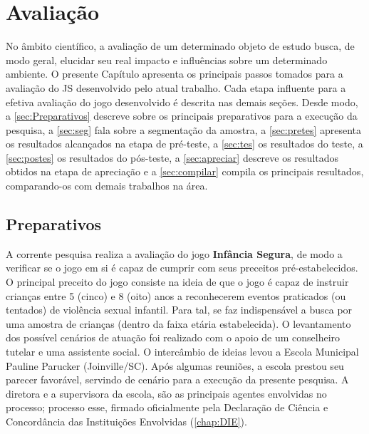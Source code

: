 \chapter{Avaliação}\label{ch:Avaliacao}

No âmbito científico, a avaliação de um determinado objeto de estudo busca, de modo geral, elucidar seu real impacto e influências sobre um determinado ambiente. O presente Capítulo apresenta os principais passos tomados para a avaliação do \acf{JS} desenvolvido pelo atual trabalho. Cada etapa influente para a efetiva avaliação do jogo desenvolvido é descrita nas demais seções. Desde modo, a \autoref{sec:Preparativos} descreve sobre os principais preparativos para a execução da pesquisa, a \autoref{sec:seg} fala sobre a segmentação da amostra, a \autoref{sec:pretes} apresenta os resultados alcançados na etapa de pré-teste, a \autoref{sec:tes} os resultados do teste, a \autoref{sec:postes} os resultados do pós-teste, a \autoref{sec:apreciar} descreve os resultados obtidos na etapa de apreciação e a \autoref{sec:compilar} compila os principais resultados, comparando-os com demais trabalhos na área. 

\section{Preparativos}\label{sec:Preparativos}

A corrente pesquisa realiza a avaliação do jogo \textbf{Infância Segura}, de modo a verificar se o jogo em si é capaz de cumprir com seus preceitos pré-estabelecidos. O principal preceito do jogo consiste na ideia de que o jogo é capaz de instruir crianças entre 5 (cinco) e 8 (oito) anos a reconhecerem eventos praticados (ou tentados) de violência sexual infantil. Para tal, se faz indispensável a busca por uma amostra de crianças (dentro da faixa etária estabelecida). O levantamento dos possível cenários de atuação foi realizado com o apoio de um conselheiro tutelar e uma assistente social. 
O intercâmbio de ideias levou a Escola Municipal Pauline Parucker (Joinville/\ac{SC}). Após algumas reuniões, a escola prestou seu parecer favorável, servindo de cenário para a execução da presente pesquisa. A diretora %
e a supervisora %
da escola, são as principais agentes envolvidas no processo; processo esse, firmado oficialmente pela Declaração de Ciência e Concordância das Instituições Envolvidas (\autoref{chap:DIE}). 

